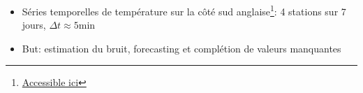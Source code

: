 \documentclass[xcolor=svgnames, t]{beamer}
\begin{document}
\begin{frame}{\subsecname}
  \begin{itemize}
    \item<1-> Séries temporelles de température sur la côté sud anglaise\footnote{\href{https://www.bramblemet.co.uk/(S(oqanew55msnsth55kvmmlxu2))/default.aspx}{Accessible ici}}:
    4 stations sur 7 jours, $\Delta t \approx 5$min
    \item<2-> But: estimation du bruit, forecasting et complétion de valeurs manquantes
    \begin{figure}
      \centering

\end{figure}
\end{itemize}
\end{frame}
\end{document}
